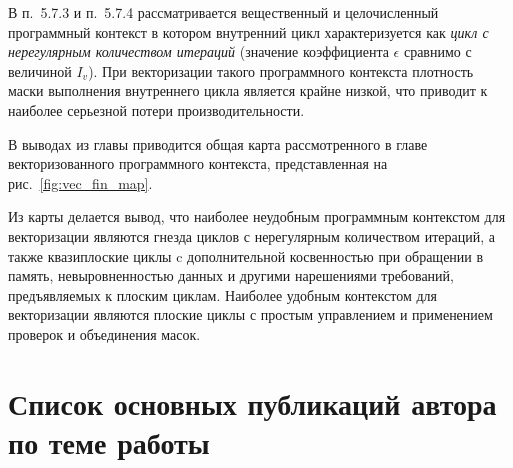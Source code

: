 \documentclass[a4paper,14pt]{extarticle}                     %
\theoremstyle{plain}                                         %
\begin{document}
В п.~5.7.3 и п.~5.7.4 рассматривается вещественный и целочисленный программный контекст в котором внутренний цикл характеризуется как \textit{цикл с нерегулярным количеством итераций} (значение коэффициента $\epsilon$ сравнимо с величиной $I_v$).
При векторизации такого программного контекста плотность маски выполнения внутреннего цикла является крайне низкой, что приводит к наиболее серьезной потери производительности. 


В выводах из главы приводится общая карта рассмотренного в главе векторизованного программного контекста, представленная на рис.~\ref{fig:vec_fin_map}.

Из карты делается вывод, что наиболее неудобным программным контекстом для векторизации являются гнезда циклов с нерегулярным количеством итераций, а также квазиплоские циклы c дополнительной косвенностью при обращении в память, невыровненностью данных и другими нарешениями требований, предъявляемых к плоским циклам.
Наиболее удобным контекстом для векторизации являются плоские циклы с простым управлением и применением проверок и объединения масок.


\section*{Список основных публикаций автора по теме работы}
\end{document}

